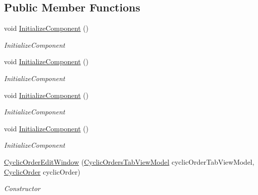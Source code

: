 \subsection*{Public Member Functions}
\begin{DoxyCompactItemize}
\item 
void \hyperlink{class_baudi_1_1_client_1_1_view_1_1_edit_windows_1_1_cyclic_order_edit_window_a2bfd48344d2d8fb44c960ec4b5d3e684}{Initialize\+Component} ()
\begin{DoxyCompactList}\small\item\em Initialize\+Component \end{DoxyCompactList}\item 
void \hyperlink{class_baudi_1_1_client_1_1_view_1_1_edit_windows_1_1_cyclic_order_edit_window_a2bfd48344d2d8fb44c960ec4b5d3e684}{Initialize\+Component} ()
\begin{DoxyCompactList}\small\item\em Initialize\+Component \end{DoxyCompactList}\item 
void \hyperlink{class_baudi_1_1_client_1_1_view_1_1_edit_windows_1_1_cyclic_order_edit_window_a2bfd48344d2d8fb44c960ec4b5d3e684}{Initialize\+Component} ()
\begin{DoxyCompactList}\small\item\em Initialize\+Component \end{DoxyCompactList}\item 
void \hyperlink{class_baudi_1_1_client_1_1_view_1_1_edit_windows_1_1_cyclic_order_edit_window_a2bfd48344d2d8fb44c960ec4b5d3e684}{Initialize\+Component} ()
\begin{DoxyCompactList}\small\item\em Initialize\+Component \end{DoxyCompactList}\item 
\hyperlink{class_baudi_1_1_client_1_1_view_1_1_edit_windows_1_1_cyclic_order_edit_window_ad1e845615fe01439ce3aa4b6ee24402c}{Cyclic\+Order\+Edit\+Window} (\hyperlink{class_baudi_1_1_client_1_1_view_models_1_1_tabs_view_models_1_1_cyclic_orders_tab_view_model}{Cyclic\+Orders\+Tab\+View\+Model} cyclic\+Order\+Tab\+View\+Model, \hyperlink{class_baudi_1_1_d_a_l_1_1_models_1_1_cyclic_order}{Cyclic\+Order} cyclic\+Order)
\begin{DoxyCompactList}\small\item\em Constructor \end{DoxyCompactList}\end{DoxyCompactItemize}



